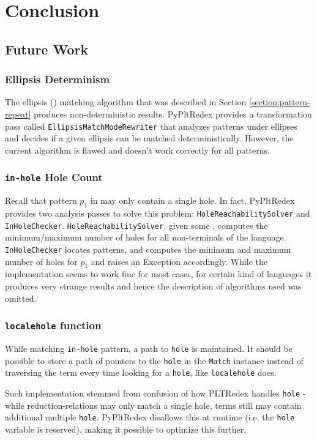 \chapter{Conclusion}

\section{Future Work}
\subsection{Ellipsis Determinism}
The ellipsis (\RepeatNoArg) matching algorithm that was described in Section \ref{section:pattern-repeat} produces non-deterministic results. PyPltRedex provides a transformation pass called \texttt{EllipsisMatchModeRewriter} that analyzes patterns under ellipses and decides if a given ellipsis can be matched deterministically. However, the current algorithm is flawed and doesn't work correctly for all patterns.

\subsection{\texttt{in-hole} Hole Count}
Recall that pattern $p_1$ in \PatternInHole \space may only contain a single hole. In fact, PyPltRedex provides two analysis passes to solve this problem: \texttt{HoleReachabilitySolver} and \texttt{InHoleChecker}. \texttt{HoleReachabilitySolver}, given some \DefineLanguageNoArg, computes the minimum/maximum number of holes for all non-terminals of the language. \texttt{InHoleChecker} locates \PatternInHoleNoArg patterns, and computes the minimum and maximum number of holes for $p_1$ and raises an Exception accordingly. While the implementation seems to work fine for most cases, for certain kind of languages it produces very strange results and hence the description of algorithms used was omitted.

\subsection{\texttt{localehole} function}
While matching \texttt{in-hole} pattern, a path to \texttt{hole} is maintained. It should be possible to store a path of pointers to the \texttt{hole} in the \texttt{Match} instance instead of traversing the term every time looking for a \texttt{hole}, like \texttt{localehole} does.

Such implementation stemmed from confusion of how PLTRedex handles \texttt{hole} - while reduction-relations may only match a single hole, terms still may contain additional multiple \texttt{hole}. PyPltRedex disallows this at runtime (i.e. the \texttt{hole} variable is reserved), making it possible to optimize this further.

